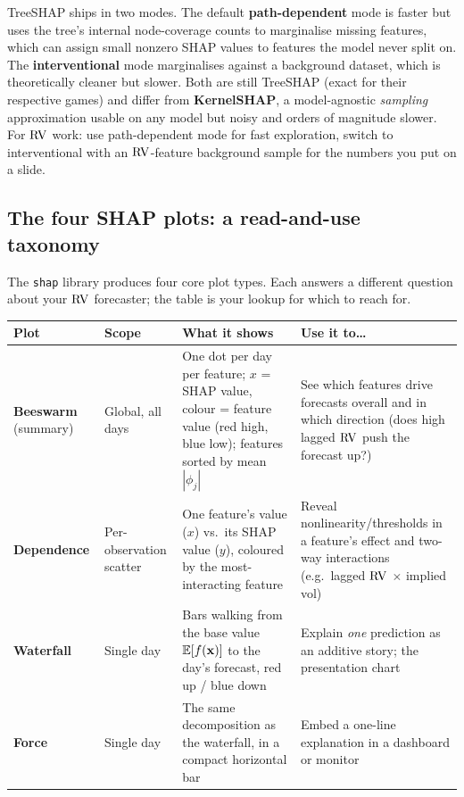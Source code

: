 \begin{warning}
TreeSHAP ships in two modes.  The default \textbf{path-dependent} mode is
faster but uses the tree's internal node-coverage counts to marginalise
missing features, which can assign small nonzero SHAP values to features the
model never split on.  The \textbf{interventional} mode marginalises against
a background dataset, which is theoretically cleaner but slower.  Both are
still TreeSHAP (exact for their respective games) and differ from
\textbf{KernelSHAP}, a model-agnostic \emph{sampling} approximation usable on
any model but noisy and orders of magnitude slower.  For $\operatorname{RV}$ work: use
path-dependent mode for fast exploration, switch to interventional with an
$\operatorname{RV}$-feature background sample for the numbers you put on a slide.
\end{warning}

\subsection{The four SHAP plots: a read-and-use taxonomy}

The \texttt{shap} library produces four core plot types.  Each answers a
different question about your $\operatorname{RV}$ forecaster; the table is your
lookup for which to reach for.

\begin{center}
\renewcommand{\arraystretch}{1.3}
\begin{tabular}{@{}p{2.6cm}p{2.4cm}p{4.0cm}p{4.2cm}@{}}
\toprule
\textbf{Plot} & \textbf{Scope} & \textbf{What it shows} & \textbf{Use it to\ldots} \\
\midrule
\textbf{Beeswarm} (summary)
  & Global, all days
  & One dot per day per feature; $x$ = SHAP value, colour = feature value
    (red high, blue low); features sorted by mean $|\phi_j|$
  & See which features drive forecasts overall and in which direction
    (does high lagged $\operatorname{RV}$ push the forecast up?) \\[4pt]
\textbf{Dependence}
  & Per-observation scatter
  & One feature's value ($x$) vs.\ its SHAP value ($y$), coloured by the
    most-interacting feature
  & Reveal nonlinearity/thresholds in a feature's effect and two-way
    interactions (e.g.\ lagged $\operatorname{RV}$ $\times$ implied vol) \\[4pt]
\textbf{Waterfall}
  & Single day
  & Bars walking from the base value $\mathbb{E}[f(\mathbf{x})]$ to the day's forecast,
    red up / blue down
  & Explain \emph{one} prediction as an additive story; the presentation
    chart \\[4pt]
\textbf{Force}
  & Single day
  & The same decomposition as the waterfall, in a compact horizontal bar
  & Embed a one-line explanation in a dashboard or monitor \\
\bottomrule
\end{tabular}
\end{center}

